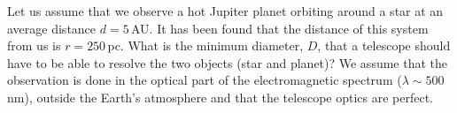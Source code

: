 Let us assume that we observe a hot Jupiter planet orbiting around a star at an
average distance $d = 5$\,AU. It has been found that the distance of this
system from us is $r = 250$\,pc. What is the minimum diameter, $D$, that a
telescope should have to be able to resolve the two objects (star and planet)?
We assume that the observation is done in the optical part of the
electromagnetic spectrum ($\lambda \sim 500$\,nm), outside the Earth's
atmosphere and that the telescope optics are perfect.

